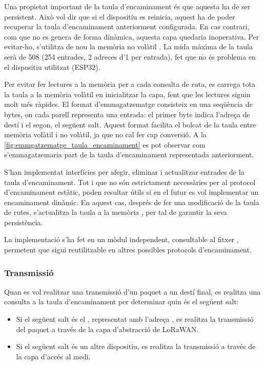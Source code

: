 \documentclass{tfgitic}[2024/07/01]
\begin{document}
{Una propietat important de la taula d'encaminament és que aquesta ha de ser persistent. Això vol dir que si el dispositiu es reinicia, aquest ha de poder recuperar la taula d'encaminament anteriorment configurada. En cas contrari, com que no es genera de forma dinàmica, aquesta capa quedaria inoperativa. Per evitar-ho, s'utilitza de nou la memòria no volàtil . La mida màxima de la taula serà de \SI{508}{\byte} (254 entrades, 2 adreces d'\SI{1}{\byte} per entrada), fet que no és problema en el dispositiu utilitzat (ESP32).

Per evitar fer lectures a la memòria  per a cada consulta de ruta, es carrega tota la taula a la memòria volàtil en inicialitzar la capa, fent que les lectures siguin molt més ràpides. El format d'emmagatzematge consisteix en una seqüència de bytes, on cada parell representa una entrada: el primer byte indica l'adreça de destí i el segon, el següent salt. Aquest format facilita el bolcat de la taula entre memòria volàtil i no volàtil, ja que no cal fer cap conversió. A la \autoref{fig:emmgatzematge_taula_encaminament} es pot observar com s'emmagatzemaria part de la taula d'encaminament representada anteriorment. 

S'han implementat interfícies per afegir, eliminar i actualitzar entrades de la taula d'encaminament. Tot i que no són estrictament necessàries per al protocol d'encaminament estàtic, poden resultar útils si en el futur es vol implementar un encaminament dinàmic. En aquest cas, després de fer una modificació de la taula de rutes, s'actualitza la taula a la memòria , per tal de garantir la seva persistència.

La implementació s'ha fet en un mòdul independent, consultable al fitxer , permetent que sigui reutilitzable en altres possibles protocols d'encaminament.
\subsubsection{Transmissió}
\label{subsubsec:routing_tx}
Quan es vol realitzar una transmissió d'un paquet a un destí final, es realitza una consulta a la taula d'encaminament per determinar quin és el següent salt:
\begin{itemize}
    \item Si el següent salt és el , representat amb l'adreça , es realitza la transmissió del paquet a través de la capa d'abstracció de LoRaWAN.
    \item Si el següent salt és un altre dispositiu, es realitza la transmissió a través de la capa d'accés al medi.
\end{itemize}

}
\end{document}
